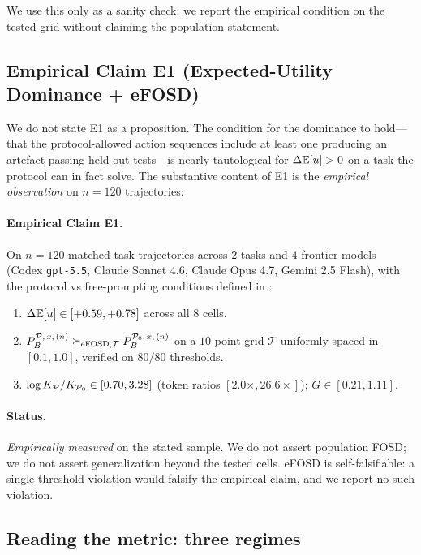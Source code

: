 We use this only as a sanity check: we report the empirical condition on the tested grid without claiming the population statement.

\subsection{Empirical Claim E1 (Expected-Utility Dominance + eFOSD)}
\label{sec:claim-e1}

We do not state E1 as a proposition. The condition for the dominance to hold---that the protocol-allowed action sequences include at least one producing an artefact passing held-out tests---is nearly tautological for $\Delta\mathbb{E}[u] > 0$ on a task the protocol can in fact solve. The substantive content of E1 is the \emph{empirical observation} on $n = 120$ trajectories:

\paragraph{Empirical Claim E1.} On $n = 120$ matched-task trajectories across $2$ tasks and $4$ frontier models (Codex \texttt{gpt-5.5}, Claude Sonnet 4.6, Claude Opus 4.7, Gemini 2.5 Flash), with the protocol vs free-prompting conditions defined in :
\begin{enumerate}[leftmargin=2em]
\item $\Delta\mathbb{E}[u] \in [+0.59, +0.78]$ across all $8$ cells.
\item $P_B^{\mathcal{P},\,x,\,(n)} \succeq_{\mathrm{eFOSD}, \mathcal{T}} P_B^{\mathcal{P}_0,\,x,\,(n)}$ on a $10$-point grid $\mathcal{T}$ uniformly spaced in $[0.1, 1.0]$, verified on $80/80$ thresholds.
\item $\log K_{\mathcal{P}}/K_{\mathcal{P}_0} \in [0.70, 3.28]$ (token ratios $[2.0\times, 26.6\times]$); $G \in [0.21, 1.11]$.
\end{enumerate}

\paragraph{Status.} \emph{Empirically measured} on the stated sample. We do not assert population FOSD; we do not assert generalization beyond the tested cells. eFOSD is self-falsifiable: a single threshold violation would falsify the empirical claim, and we report no such violation.

\subsection{Reading the metric: three regimes}

